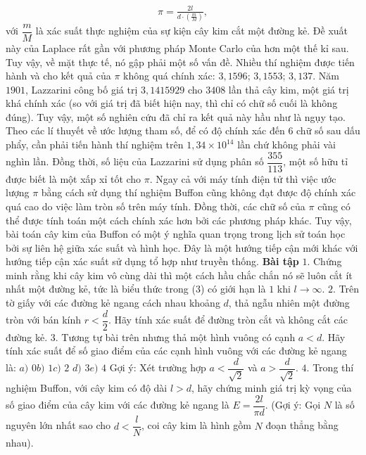 \begin{multicols}{2}
\begin{align*}
		\pi = \frac{2l}{d\cdot\left(\frac{m}{M}\right)},
	\end{align*}
	với $\dfrac{m}{M}$ là xác suất thực nghiệm của sự kiện cây kim cắt một đường kẻ.
	\vskip 0.1cm
	Đề xuất này của Laplace rất gần với phương pháp Monte Carlo của hơn một thế kỉ sau. Tuy vậy, về mặt thực tế, nó gập phải một số vấn đề. Nhiều thí nghiệm được tiến hành và cho kết quả của $\pi$ không quá chính xác: $3{,}1596$; $3{,}1553$; $3{,}137$.
	\vskip 0.1cm 
	Năm $1901$, Lazzarini công bố giá trị $3{,}1415929$ cho $3408$ lần thả cây kim, một giá trị khá chính xác (so với giá trị đã biết hiện nay, thì chỉ có chữ số cuối là không đúng). Tuy vậy, một số nghiên cứu đã chỉ ra kết quả này hầu như là ngụy tạo. Theo các lí thuyết về ước lượng tham số, để có độ chính xác đến $6$ chữ số sau dấu phẩy, cần phải tiến hành thí nghiệm trên $1{,}34×10^{14}$ lần chứ không phải vài nghìn lần. Đồng thời, số liệu của Lazzarini sử dụng phân số $\dfrac{355}{113}$, một số hữu tỉ được biết là một xấp xỉ tốt cho $\pi$. 
	\vskip 0.1cm
	Ngay cả với máy tính điện tử thì việc ước lượng $\pi$ bằng cách sử dụng thí nghiệm Buffon cũng không đạt được độ chính xác quá cao do việc làm tròn số trên máy tính. Đồng thời, các chữ số của $\pi$ cũng có thể được tính toán một cách chính xác hơn bởi các phương pháp khác.
	\vskip 0.1cm
	Tuy vậy, bài toán cây kim của Buffon có một ý nghĩa quan trọng trong lịch sử toán học bởi sự liên hệ giữa xác suất và hình học. Đây là một hướng tiếp cận mới khác với hướng tiếp cận xác suất sử dụng tổ hợp như truyền thống.
	\vskip 0.1cm
	\textbf{\color{toanhocdoisong}Bài tập}
	\vskip 0.1cm
	$1$. Chứng minh rằng khi cây kim vô cùng dài thì một cách hầu chắc chắn nó sẽ luôn cắt ít nhất một đường kẻ, tức là biểu thức trong ($3$) có giới hạn là $1$ khi $l\to \infty$.
	\vskip 0.1cm
	$2$. Trên tờ giấy với các đường kẻ ngang cách nhau khoảng $d$, thả ngẫu nhiên một đường tròn với bán kính $r < \dfrac{d}{2}$. Hãy tính xác suất để đường tròn cắt và không cắt các đường kẻ.
	\vskip 0.1cm
	$3$. Tương tự bài trên nhưng thả một hình vuông có cạnh $a<d$. Hãy tính xác suất để số giao điểm của các cạnh hình vuông với các đường kẻ ngang là:
	\vskip 0.1cm
	$a)$ $0$\quad\quad		$b)$ $1$\quad\quad		$c)$ $2$\quad\quad
	$d)$ $3$\quad\quad		$e)$ $4$
	\vskip 0.1cm
	Gợi ý: Xét trường hợp $a<\dfrac{d}{\sqrt{2}}$ và $a> \dfrac{d}{\sqrt{2}}$.
	\vskip 0.1cm	
	$4$. Trong thí nghiệm Buffon, với cây kim có độ dài $l>d$, hãy chứng minh giá trị kỳ vọng của số giao điểm của cây kim với các đường kẻ ngang là $E = \dfrac{2l}{\pi d}$. (Gợi ý: Gọi $N$ là số nguyên lớn nhất sao cho $d<\dfrac{l}{N}$, coi cây kim là hình gồm $N$ đoạn thẳng bằng nhau).

\end{multicols}
